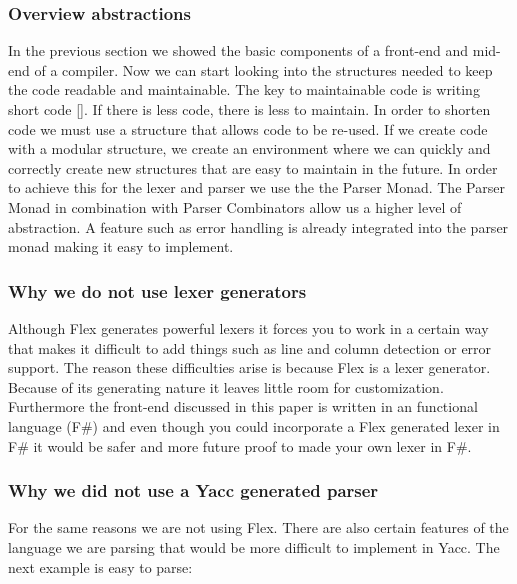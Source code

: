 \subsubsection{Overview abstractions}

In the previous section we showed the basic components of a front-end and mid-end of a compiler. Now we can start looking into the structures needed to keep the code readable and maintainable. 
\linebreak
The key to maintainable code is writing short code []. If there is less code, there is less to maintain. In order to shorten code we must use a structure that allows code to be re-used. If we create code with a modular structure, we create an environment where we can quickly and correctly create new structures that are easy to maintain in the future. 
\linebreak
In order to achieve this for the lexer and parser we use the the Parser Monad. The Parser Monad in combination with Parser Combinators allow us a higher level of abstraction. A feature such as error handling is already integrated into the parser monad making it easy to implement. 

\subsubsection{Why we do not use lexer generators}

Although Flex generates powerful lexers it forces you to work in a certain way that makes it difficult to add things such as line and column detection or error support. The reason these difficulties arise is because Flex is a lexer generator. Because of its generating nature it leaves little room for customization. 
\linebreak
Furthermore the front-end discussed in this paper is written in an functional language (F\#) and even though you could incorporate a Flex generated lexer in F\# it would be safer and more future proof to made your own lexer in F\#. 

\subsubsection{Why we did not use a Yacc generated parser}

For the same reasons we are not using Flex. There are also certain features of the language we are parsing that would be more difficult to implement in Yacc. The next example is easy to parse: 

